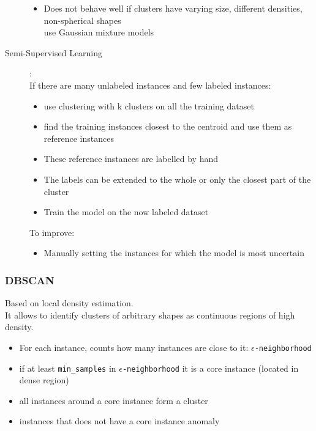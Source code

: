 \begin{description}
\begin{itemize}
            \item Does not behave well if clusters have varying size, different densities, non-spherical shapes\\
                \arrow use Gaussian mixture models
        \end{itemize}
    \item[Semi-Supervised Learning]: \hfill\\
        If there are many unlabeled instances and few labeled instances:\\
        \begin{itemize}
            \item use clustering with k clusters on all the training dataset
            \item find the training instances closest to the centroid and use them as reference instances
            \item These reference instances are labelled by hand
            \item The labels can be extended to the whole or only the closest part of the cluster
            \item Train the model on the now labeled dataset
        \end{itemize}
        To improve:
        \begin{itemize}
            \item Manually setting the instances for which the model is most uncertain
        \end{itemize}
\end{description}

\subsubsection{DBSCAN}

Based on local density estimation.\\
It allows to identify clusters of arbitrary shapes as continuous regions of high density.
\begin{itemize}
    \item For each instance, counts how many instances are close to it: $\epsilon$\verb;-neighborhood;
    \item if at least \verb;min_samples; in $\epsilon$\verb;-neighborhood; \arrow it is a core instance (located in
        dense region)
    \item all instances around a core instance form a cluster
    \item instances that does not have a core instance \arrow anomaly
\end{itemize}

